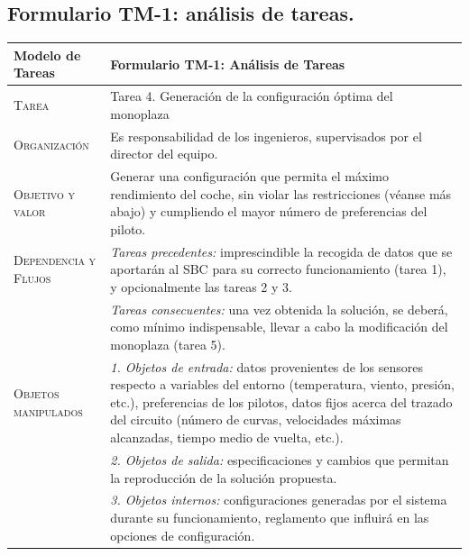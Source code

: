 \documentclass[12pt,a4paper,twoside,spanish]{article}      %
\begin{document}
\subsection{Formulario TM-1: análisis de tareas.}

\begin{table}[H]
\scriptsize
\begin{tabularx}{\textwidth}{|l|X|} \hline

\textbf{Modelo de Tareas} & \textbf{Formulario TM-1: Análisis de Tareas} \\ \hline\hline

\textsc{Tarea} & 
Tarea 4. Generación de la configuración óptima del monoplaza\\ \hline

\textsc{Organización}  & 
Es responsabilidad de los ingenieros, supervisados por el director del equipo. \\ \hline

\textsc{Objetivo y valor} & 
Generar una configuración que permita el máximo rendimiento del coche, sin violar las restricciones (véanse más abajo) y cumpliendo el mayor número de preferencias del piloto.\\ \hline

\textsc{Dependencia y Flujos} &
\textit{Tareas precedentes:} imprescindible la recogida de datos que se aportarán al SBC para su correcto funcionamiento (tarea 1), y opcionalmente las tareas 2 y 3. \\ &
\textit{Tareas consecuentes:} una vez obtenida la solución, se deberá, como mínimo indispensable, llevar a cabo la modificación del monoplaza (tarea 5). \\ \hline

\textsc{Objetos manipulados} &
\textit{1. Objetos de entrada:} datos provenientes de los sensores respecto a variables del entorno (temperatura, viento, presión, etc.), preferencias de los pilotos, datos fijos acerca del trazado del circuito (número de curvas, velocidades máximas alcanzadas, tiempo medio de vuelta, etc.). \\ &
\textit{2. Objetos de salida:} especificaciones y cambios que permitan la reproducción de la solución propuesta.\\ &
\textit{3. Objetos internos:} configuraciones generadas por el sistema durante su funcionamiento, reglamento que influirá en las opciones de configuración. \\ \hline


\end{tabularx}
\end{table}
\end{document}
